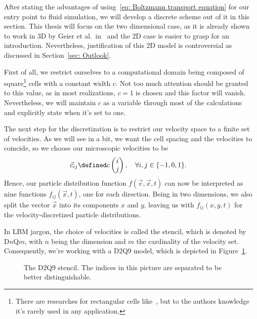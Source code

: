 After stating the advantages of using~\eqref{eq: Boltzmann transport equation} for our entry point to fluid simulation, we will develop a discrete scheme out of it in this section.
This thesis will focus on the two dimensional case, as it is already shown to work in 3D by Geier et al.\ in~\cite{geier2015cumulant} and the 2D case is easier to grasp for an introduction. Nevertheless, justification of this 2D model is controversial as discussed in Section~\ref{sec: Outlook}.

First of all, we restrict ourselves to a computational domain being composed of square\footnote{There are researches for rectangular cells like~\cite{Bouzidi2001704}, but to the authors knowledge it's rarely used in any application.} cells with a constant width $c$.
Not too much attention should be granted to this value, as in most realizations, $c=1$ is chosen and this factor will vanish.
Nevertheless, we will maintain $c$ as a variable through most of the calculations and explicitly state when it's set to one.

The next step for the discretization is to restrict our velocity space to a finite set of velocities. As we will see in a bit, we want the cell spacing and the velocities to coincide, so we choose our microscopic velocities to be
\begin{equation}
  \label{eq: definition of the velocities}
  \vec{c}_{ij} \defined c\begin{pmatrix}i \\ j\end{pmatrix}, \quad\forall i,j\in \{-1, 0, 1\}.
\end{equation}
Hence, our particle distribution function $f(\vec{v},\vec{x},t)$ can now be interpreted as nine functions $f_{ij}(\vec{x},t)$, one for each direction.
Being in two dimensions, we also split the vector $\vec{x}$ into its components $x$ and $y$, leaving us with $f_{ij}(x,y,t)$ for the velocity-discretized particle distributions.

In LBM jargon, the choice of velocities is called the stencil, which is denoted by D$n$Q$m$, with $n$ being the dimension and $m$ the cardinality of the velocity set.
Consequently, we're working with a D2Q9 model, which is depicted in Figure~\ref{fig: D2Q9 stencil}.

\begin{figure}
  \centering
  
\caption{The D$2$Q$9$ stencil. The indices in this picture are separated to be better distinguishable.}
\label{fig: D2Q9 stencil}
\end{figure}

